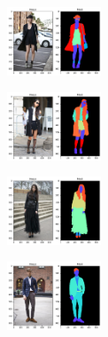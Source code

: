 \documentclass{article}
\begin{document}
\begin{multicols}{4}
\begin{figure}[H]
    \begin{center}
    \includegraphics[width=0.25\textwidth]{img/FirstImMask.png}
    \label{fig:img1}
\end{center}
\end{figure}
\columnbreak
\begin{figure}[H]
    \begin{center}
    \includegraphics[width=0.25\textwidth]{img/SecondImMask.png}
    \label{fig:img2}
\end{center}
\end{figure}
\columnbreak
\begin{figure}[H]
    \begin{center}
    \includegraphics[width=0.25\textwidth]{img/ThirdImMask.png}
    \label{fig:img3}
\end{center}
\end{figure}
\columnbreak
\begin{figure}[H]
    \begin{center}
    \includegraphics[width=0.25\textwidth]{img/FourthImMask.png}
    \label{fig:img4}
\end{center}
\end{figure}
\end{multicols}
\end{document}
